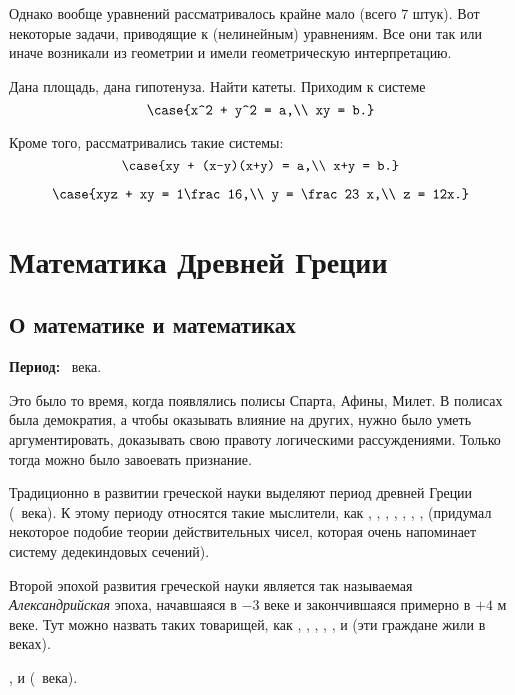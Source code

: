 \documentclass[a4paper,oneside,fleqn,10pt]{article}
\begin{document}
Однако вообще уравнений рассматривалось крайне мало (всего $7$ штук).
Вот некоторые задачи, приводящие к (нелинейным) уравнениям. Все они так или
иначе возникали из геометрии и имели геометрическую интерпретацию.

Дана площадь, дана гипотенуза. Найти катеты. Приходим к системе
$$\case{x^2 + y^2 = a,\\ xy = b.}$$

Кроме того, рассматривались такие системы:
$$\case{xy + (x-y)(x+y) = a,\\
x+y = b.}$$

$$\case{xyz + xy = 1\frac16,\\
y = \frac23 x,\\
z = 12x.}$$


\section{Математика Древней Греции}

\subsection{О математике и математиках}

\textbf{Период:} ~века.

Это было то время, когда появлялись полисы Спарта, Афины, Милет.
В полисах была демократия, а чтобы оказывать влияние на других,
нужно было уметь аргументировать, доказывать свою правоту логическими
рассуждениями. Только тогда можно было завоевать признание.

Традиционно в развитии греческой науки выделяют
период древней Греции (~века).
К этому периоду относятся такие мыслители, как ,
, , , , , , 
(придумал некоторое подобие теории действительных чисел, которая очень напоминает
систему дедекиндовых сечений).

Второй эпохой развития греческой науки является так называемая \emph{Александрийская} эпоха,
начавшаяся в $-3$ веке и закончившаяся примерно в $+4$ м веке.
Тут можно назвать таких товарищей, как , , ,
, ,  и 
(эти граждане жили в  веках).

,  и  (~века).
\end{document}
